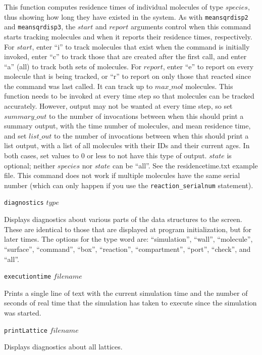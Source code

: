 \documentclass {book}
\newcommand {\ttt} {\texttt}
\begin{document}
\begin{description}
This function computes residence times of individual molecules of type $species$, thus showing how long they have existed in the system. As with \ttt{meansqrdisp2} and \ttt{meansqrdisp3}, the $start$ and $report$ arguments control when this command starts tracking molecules and when it reports their residence times, respectively. For $start$, enter ``i'' to track molecules that exist when the command is initially invoked, enter ``c'' to track those that are created after the first call, and enter ``a'' (all) to track both sets of molecules. For $report$, enter ``e'' to report on every molecule that is being tracked, or ``r'' to report on only those that reacted since the command was last called. It can track up to $max\_mol$ molecules. This function needs to be invoked at every time step so that molecules can be tracked accurately. However, output may not be wanted at every time step, so set $summary\_out$ to the number of invocations between when this should print a summary output, with the time number of molecules, and mean residence time, and set $list\_out$ to the number of invocations between when this should print a list output, with a list of all molecules with their IDs and their current ages. In both cases, set values to 0 or less to not have this type of output. $state$ is optional; neither $species$ nor $state$ can be ``all''. See the residencetime.txt example file. This command does not work if multiple molecules have the same serial number (which can only happen if you use the \ttt{reaction\_serialnum} statement).

\item{\ttt{diagnostics} $type$}

Displays diagnostics about various parts of the data structures to the screen. These are identical to those that are displayed at program initialization, but for later times. The options for the type word are: ``simulation'', ``wall'', ``molecule'', ``surface'', ``command'', ``box'', ``reaction'', ``compartment'', ``port'', ``check'', and ``all''.

\item{\ttt{executiontime} $filename$}

Prints a single line of text with the current simulation time and the number of seconds of real time that the simulation has taken to execute since the simulation was started.

\item{\ttt{printLattice} $filename$}

Displays diagnostics about all lattices.


\end{description}
\end{document}
